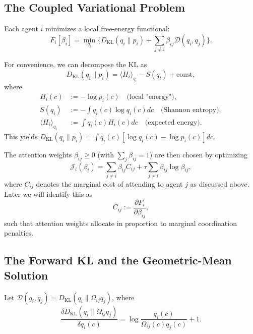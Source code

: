 \documentclass[11pt]{article}
\begin{document}
\subsection*{The Coupled Variational Problem}

Each agent $i$ minimizes a local free-energy functional:
\begin{equation}
F_i[\beta_i]
=\min_{q_i}
\Big\{
D_{\mathrm{KL}}(q_i \| p_i)
+ \sum_{j\neq i} \beta_{ij}\mathcal{D}(q_i,q_j)
\Big\}.
\label{eq:F_i_app}
\end{equation}

For convenience, we can decompose the KL as
\begin{equation}
D_{\mathrm{KL}}(q_i \| p_i) = \langle H_i \rangle_{q_i} - S(q_i) + \text{const},
\end{equation}
where
\begin{align}
H_i(c) &:= -\log p_i(c) \quad \text{(local "energy")}, \\
S(q_i) &:= -\int q_i(c) \log q_i(c)dc \quad \text{(Shannon entropy)}, \\
\langle H_i \rangle_{q_i} &:= \int q_i(c) H_i(c)dc \quad \text{(expected energy)}.
\end{align}
This yields $D_{\mathrm{KL}}(q_i \| p_i) = \int q_i(c)[\log q_i(c) - \log p_i(c)]dc$.

The attention weights $\beta_{ij}\ge 0$ (with $\sum_j \beta_{ij}=1$) are then chosen by optimizing
\begin{equation}
\mathcal{J}_i(\beta_i)
=\sum_{j\neq i}\beta_{ij} C_{ij}
+ \tau \sum_{j\neq i}\beta_{ij}\log\beta_{ij},
\end{equation}
where $C_{ij}$ denotes the marginal cost of attending to agent $j$ as discussed above. Later we will identify this as
\begin{equation}
C_{ij} := \frac{\partial F_i}{\partial \beta_{ij}},
\end{equation}
such that attention weights allocate in proportion to marginal coordination penalties.

\subsection*{The Forward KL and the Geometric-Mean Solution}

Let $\mathcal{D}(q_i,q_j) = D_{\mathrm{KL}}(q_i \| \Omega_{ij} q_j)$, where
\[
\frac{\delta D_{\mathrm{KL}}(q_i \| \Omega_{ij} q_j)}{\delta q_i(c)}
= \log\frac{q_i(c)}{\Omega_{ij}(c) q_j(c)} + 1.
\]
\end{document}
